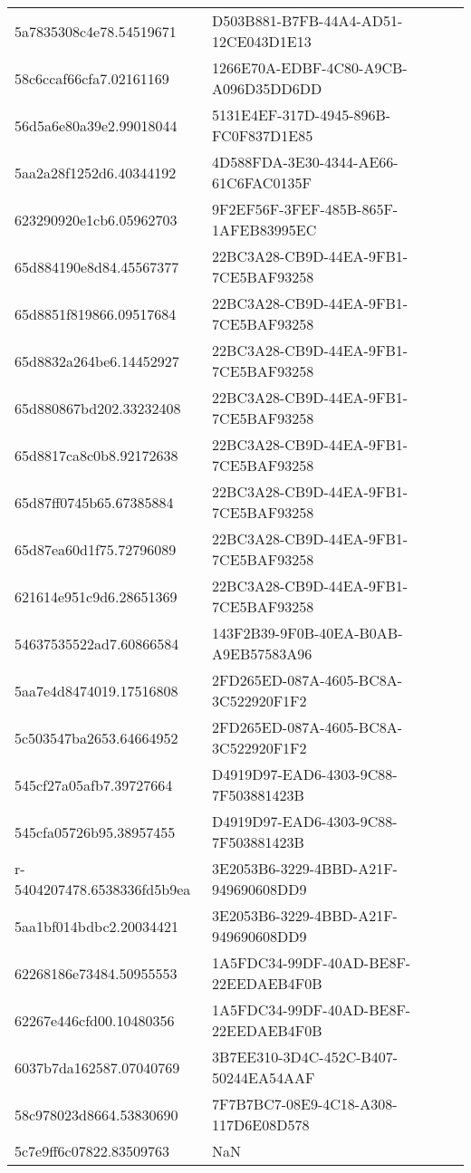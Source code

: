 \begin{tabular}{ll}
5a7835308c4e78.54519671 & D503B881-B7FB-44A4-AD51-12CE043D1E13 \\
58c6ccaf66cfa7.02161169 & 1266E70A-EDBF-4C80-A9CB-A096D35DD6DD \\
56d5a6e80a39e2.99018044 & 5131E4EF-317D-4945-896B-FC0F837D1E85 \\
5aa2a28f1252d6.40344192 & 4D588FDA-3E30-4344-AE66-61C6FAC0135F \\
623290920e1cb6.05962703 & 9F2EF56F-3FEF-485B-865F-1AFEB83995EC \\
65d884190e8d84.45567377 & 22BC3A28-CB9D-44EA-9FB1-7CE5BAF93258 \\
65d8851f819866.09517684 & 22BC3A28-CB9D-44EA-9FB1-7CE5BAF93258 \\
65d8832a264be6.14452927 & 22BC3A28-CB9D-44EA-9FB1-7CE5BAF93258 \\
65d880867bd202.33232408 & 22BC3A28-CB9D-44EA-9FB1-7CE5BAF93258 \\
65d8817ca8c0b8.92172638 & 22BC3A28-CB9D-44EA-9FB1-7CE5BAF93258 \\
65d87ff0745b65.67385884 & 22BC3A28-CB9D-44EA-9FB1-7CE5BAF93258 \\
65d87ea60d1f75.72796089 & 22BC3A28-CB9D-44EA-9FB1-7CE5BAF93258 \\
621614e951c9d6.28651369 & 22BC3A28-CB9D-44EA-9FB1-7CE5BAF93258 \\
54637535522ad7.60866584 & 143F2B39-9F0B-40EA-B0AB-A9EB57583A96 \\
5aa7e4d8474019.17516808 & 2FD265ED-087A-4605-BC8A-3C522920F1F2 \\
5c503547ba2653.64664952 & 2FD265ED-087A-4605-BC8A-3C522920F1F2 \\
545cf27a05afb7.39727664 & D4919D97-EAD6-4303-9C88-7F503881423B \\
545cfa05726b95.38957455 & D4919D97-EAD6-4303-9C88-7F503881423B \\
r-5404207478.6538336fd5b9ea & 3E2053B6-3229-4BBD-A21F-949690608DD9 \\
5aa1bf014bdbc2.20034421 & 3E2053B6-3229-4BBD-A21F-949690608DD9 \\
62268186e73484.50955553 & 1A5FDC34-99DF-40AD-BE8F-22EEDAEB4F0B \\
62267e446cfd00.10480356 & 1A5FDC34-99DF-40AD-BE8F-22EEDAEB4F0B \\
6037b7da162587.07040769 & 3B7EE310-3D4C-452C-B407-50244EA54AAF \\
58c978023d8664.53830690 & 7F7B7BC7-08E9-4C18-A308-117D6E08D578 \\
5c7e9ff6c07822.83509763 & NaN \\

\end{tabular}
